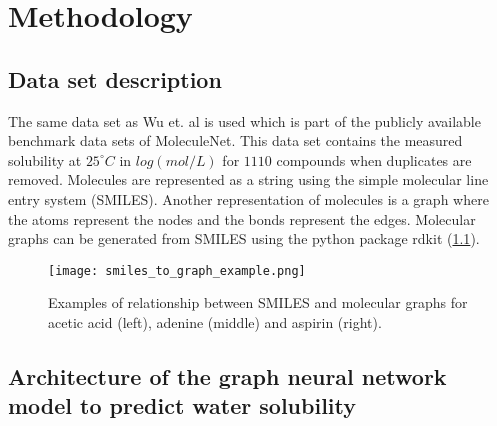 \chapter{Methodology}


\section{Data set description}

The same data set as Wu et. al is used which is part of the publicly available 
benchmark data sets of MoleculeNet.\cite{wu2018moleculenet} This data set contains 
the measured solubility at $25^{\circ} C$ in $log(mol/L)$ for $1110$ compounds when duplicates 
are removed. Molecules are represented as a string using the simple molecular 
line entry system \big(SMILES\big).\cite{weininger1988smiles} Another representation 
of molecules is a graph where the atoms represent the nodes and the bonds represent 
the edges. Molecular graphs can be generated from SMILES using the python package 
rdkit (\cref{fig:smiles_and_graphs}).\cite{landrum2010r}


\begin{figure}[h]
    \centering
    \texttt{[image: smiles\_to\_graph\_example.png]}
    \caption{Examples of relationship between SMILES and molecular graphs for acetic acid (left),
    adenine (middle) and aspirin (right).}
    \label{fig:smiles_and_graphs}
\end{figure}



\section{Architecture of the graph neural network model to predict water solubility}
